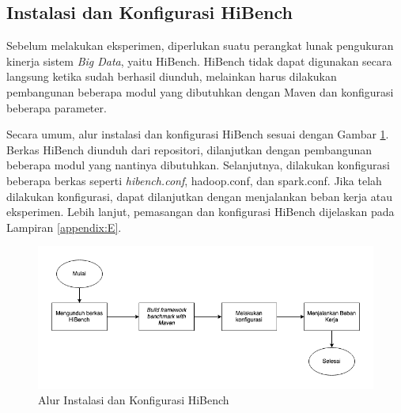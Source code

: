 \subsection{Instalasi dan Konfigurasi HiBench}
Sebelum melakukan eksperimen, diperlukan suatu perangkat lunak pengukuran kinerja sistem \textit{Big Data}, yaitu HiBench. HiBench tidak dapat digunakan secara langsung ketika sudah berhasil diunduh, melainkan harus dilakukan pembangunan beberapa modul yang dibutuhkan dengan Maven dan konfigurasi beberapa parameter. 

Secara umum, alur instalasi dan konfigurasi HiBench sesuai dengan Gambar \ref{fig:hibench-flow}. Berkas HiBench diunduh dari repositori, dilanjutkan dengan pembangunan beberapa modul yang nantinya dibutuhkan. Selanjutnya, dilakukan konfigurasi beberapa berkas seperti \textit{hibench.conf}, hadoop.conf, dan spark.conf. Jika telah dilakukan konfigurasi, dapat dilanjutkan dengan menjalankan beban kerja atau eksperimen. Lebih lanjut, pemasangan dan konfigurasi HiBench dijelaskan pada Lampiran \ref{appendix:E}.

\begin{figure}[h]
    \centering
    \includegraphics[width=1\textwidth]{figures/ch03/hibench-flow.png}
    \caption{Alur Instalasi dan Konfigurasi HiBench}
    \label{fig:hibench-flow}
\end{figure}



